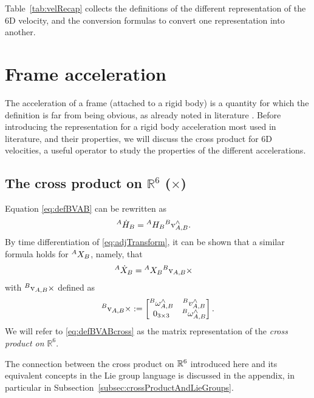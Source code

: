 Table~\ref{tab:velRecap} collects the definitions of the different representation of the 6D velocity, and the conversion formulas to convert one representation into another.


\section{Frame acceleration}
The acceleration of a frame (attached to a rigid body) is a quantity for which the definition is far from being obvious, as already noted in literature \citep{Featherstone2001}. Before introducing the representation for a rigid body acceleration most used in literature, and their properties, we will discuss the cross product for 6D velocities, a useful operator to study the properties of the different accelerations.

\subsection{The cross product on $\mathbb{R}^6$ ($\times$)}
Equation \eqref{eq:defBVAB} can be rewritten as
\begin{align}
  \hspace{0em}^A{\dot H}_B & = 
  \hspace{0em}^AH_B \hspace{0em}^B{\rm v}_{A,B}^\wedge .
\end{align}
By time differentiation of \eqref{eq:adjTransform}, it can be shown that
a similar formula holds for $\hspace{0em}^AX_B$, namely, that
\begin{align} \label{eq:dAXBdt}
  \hspace{0em}^A{\dot X}_B & = 
  \hspace{0em}^AX_B \hspace{0em}^B{\rm v}_{A,B}\times
\end{align}
with $\hspace{0em}^B{\rm v}_{A,B}\times$ defined as
\begin{equation}
\label{eq:defBVABcross}
\hspace{0em}^B{\rm v}_{A,B} \times := 
\begin{bmatrix}
\hspace{0em}^B\omega_{A,B}^\wedge & 
\hspace{0em}^Bv_{A,B}^\wedge \\
0_{3 \times 3} & 
\hspace{0em}^B\omega_{A,B}^\wedge
\end{bmatrix}.
\end{equation}
We will refer to \eqref{eq:defBVABcross} as
the matrix representation 
of the {\em cross product on $\mathbb{R}^6$}. 

\begin{remark}
The connection between the cross product on $\mathbb{R}^6$ introduced here and its equivalent concepts in the Lie group language is discussed in the appendix, in particular in Subsection~\ref{subsec:crossProductAndLieGroups}.
\end{remark}



